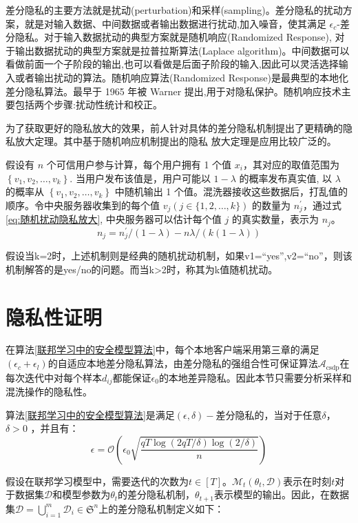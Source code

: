 差分隐私的主要方法就是扰动(perturbation)和采样(sampling)。差分隐私的扰动方案，就是对输入数据、中间数据或者输出数据进行扰动,加入噪音，使其满足 $\epsilon_{c}$-差分隐私。对于输入数据扰动的典型方案就是随机响应(Randomized Response), 对于输出数据扰动的典型方案就是拉普拉斯算法(Laplace algorithm)。中间数据可以看做前面一个子阶段的输出,也可以看做是后面子阶段的输入,因此可以灵活选择输入或者输出扰动的算法。随机响应算法(Randomized Response)是最典型的本地化差分隐私算法。最早于 1965 年被 Warner 提出,用于对隐私保护。随机响应技术主要包括两个步骤:扰动性统计和校正。

为了获取更好的隐私放大的效果，前人针对具体的差分隐私机制提出了更精确的隐私放大定理。其中基于随机响应机制提出的隐私
放大定理是应用比较广泛的。

假设有 $n$ 个可信用户参与计算，每个用户拥有 1 个值 $x_{i}$，其对应的取值范围为 $\left\{v_{1}, v_{2}, \ldots, v_{k}\right\}$. 当用户发布该值是，用户可能以 $1-\lambda$ 的概率发布真实值, 以 $\lambda$ 的概率从 $\left\{v_{1}, v_{2}, \ldots, v_{k}\right\}$ 中随机输出 1 个值。混洗器接收这些数据后，打乱值的顺序。令中央服务器收集到的每个值 $v_{j}(j \in\{1,2, \ldots, k\})$ 的数量为 $n_{j}^{\prime}$，通过式\ref{eq:随机扰动隐私放大}, 中央服务器可以估计每个值 $j$ 的真实数量，表示为 $n_{j}$。
\begin{equation}\label{eq:随机扰动隐私放大}
n_{j}=n_{j}^{\prime} /(1-\lambda)-n \lambda /(k(1-\lambda))
\end{equation}

假设当k=2时，上述机制则是经典的随机扰动机制，如果v1=“yes”,v2=“no”，则该机制解答的是yes/no的问题。而当k>2时，称其为k值随机扰动。

\section{隐私性证明}
在算法\ref{联邦学习中的安全模型算法}中，每个本地客户端采用第三章的满足$\left(\epsilon_{c}+\epsilon_{l}\right)$的自适应本地差分隐私算法，由差分隐私的强组合性可保证算法$\mathcal{A}_{\text {csdp}}$在每次迭代中对每个样本$d_{i j}$都能保证$\epsilon_{0}$的本地差异隐私。因此本节只需要分析采样和混洗操作的隐私性。

\begin{theorem}\label{隐私性证明}
算法\ref{联邦学习中的安全模型算法}是满足$(\epsilon, \delta)-$差分隐私的，当对于任意$\delta$，$\delta>0$ ，并且有：
$$
\epsilon=\mathcal{O}\left(\epsilon_{0} \sqrt{\frac{q T \log (2 q T / \delta) \log (2 / \delta)}{n}}\right)
$$
\end{theorem}

假设在联邦学习模型中，需要迭代的次数为$t \in[T]$。$\mathcal{M}_{t}\left(\theta_{t}, \mathcal{D}\right)$表示在时刻$t$对于数据集$\mathcal{D}$和模型参数为$\theta_{t}$的差分隐私机制，$\theta_{t+1}$表示模型的输出。因此，在数据集$\mathcal{D}=\bigcup_{i=1}^{m} \mathcal{D}_{i} \in \mathfrak{S}^{n}$上的差分隐私机制定义如下：

